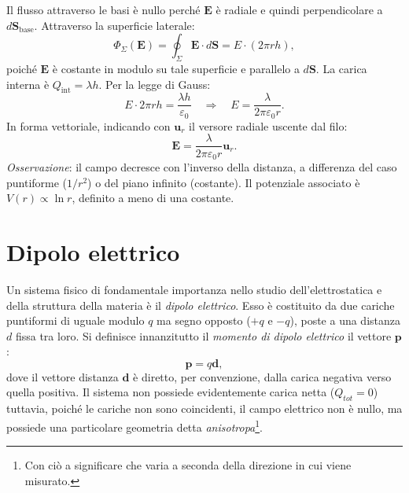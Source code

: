 \documentclass[a4paper,11pt]{report}
\begin{document}
Il flusso attraverso le basi è nullo perché \(\bm{E}\) è radiale e quindi perpendicolare a \(d\bm{S}_{\text{base}}\). 
Attraverso la superficie laterale:
\begin{equation}
    \Phi_{\Sigma}(\bm{E}) = \oint_{\Sigma} \bm{E} \cdot d\bm{S} = E \cdot (2\pi r h),
\end{equation}
poiché \(\bm{E}\) è costante in modulo su tale superficie e parallelo a \(d\bm{S}\).
La carica interna è \(Q_{\text{int}} = \lambda h\). Per la legge di Gauss:
\begin{equation}
    E \cdot 2\pi r h = \frac{\lambda h}{\varepsilon_0} \quad\Rightarrow\quad E = \frac{\lambda}{2\pi\varepsilon_0 r}.
\end{equation}
In forma vettoriale, indicando con \(\bm{u}_r\) il versore radiale uscente dal filo:
\begin{equation}
    \bm{E} = \frac{\lambda}{2\pi\varepsilon_0 r} \bm{u}_r.
\end{equation}
\textit{Osservazione}: il campo decresce con l'inverso della distanza, a differenza del caso puntiforme (\(1/r^2\)) o del piano infinito (costante). 
Il potenziale associato è \(V(r) \propto \ln r\), definito a meno di una costante.

\section{Dipolo elettrico}

Un sistema fisico di fondamentale importanza nello studio dell'elettrostatica e della struttura della materia è il \textit{dipolo elettrico}. Esso è costituito da due cariche puntiformi di uguale modulo $q$ ma segno opposto ($+q$ e $-q$), poste a una distanza $d$ fissa tra loro.
Si definisce innanzitutto il \textit{momento di dipolo elettrico} il vettore $\bm{p}$:
\begin{equation}
    \bm{p} = q \bm{d},
\end{equation}
dove il vettore distanza $\bm{d}$ è diretto, per convenzione, dalla carica negativa verso quella positiva.
Il sistema non possiede evidentemente carica netta ($Q_{tot} = 0$) tuttavia, poiché le cariche non sono coincidenti, il campo elettrico non è nullo, ma possiede una particolare geometria detta \textit{anisotropa}\footnote{Con ciò a significare che varia a seconda della direzione in cui viene misurato.}.
\end{document}
